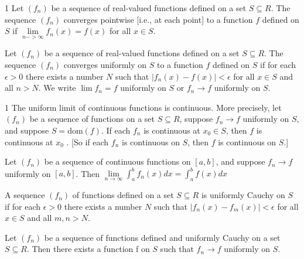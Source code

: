 

\begin{defn}{1}
	Let $(f_n)$ be a sequence of real-valued functions defined on a set $S \subseteq R$. The sequence $(f_n)$ converges pointwise [i.e., at each point] to a	function $f$ defined on $S$ if $\lim\limits_{n->\infty} f_n(x) = f(x)$	for all $x \in S$.
\end{defn}

\begin{defn}{1}
	Let $(f_n)$ be a sequence of real-valued functions defined on a set
	$S \subseteq R$. The sequence $(f_n)$ converges uniformly on $S$ to a function $f$ defined on $S$ if for each $\epsilon > 0$ there exists a number $N$ such that $|f_n(x) − f(x)| < \epsilon$ for all $x \in S$ and all $n > N$. We write $\lim f_n = f$ uniformly on $S$ or $f_n \rightarrow f$ uniformly on $S$.
\end{defn}

\begin{theo}{1}
	The uniform limit of continuous functions is continuous. More precisely, let $(f_n)$ be a sequence of functions on a set $S \subseteq R$, suppose $f_n \rightarrow f$ uniformly on $S$, and suppose $S = \textrm{dom}(f)$. If each $f_n$ is
	continuous at $x_0 \in S$, then $f$ is continuous at $x_0$ . [So if each $f_n$ is
	continuous on $S$, then $f$ is continuous on $S$.]
\end{theo}


\begin{theo}{1}
	Let $(f_n)$ be a sequence of continuous functions on $[a, b]$, and suppose $f_n \rightarrow f$ uniformly on $[a, b]$. Then $\lim\limits_{n\rightarrow \infty} \int_{a}^{b}f_n(x) dx = \int_{a}^{b} f(x) dx$
\end{theo}

\begin{defn}{1}
	A sequence $(f_n)$ of functions defined on a set $S \subseteq R$ is uniformly Cauchy on $S$ if for each $\epsilon > 0$ there exists a number $N$ such that $|f_n(x) - f_m(x)| < \epsilon$ for all $x \in S$ and all $m, n > N$.
\end{defn}

\begin{theo}{1}
	Let $(f_n)$ be a sequence of functions defined and uniformly Cauchy on a set $S \subseteq R$. Then there exists a function f on $S$ such that $f_n \rightarrow f$ uniformly on $S$.
\end{theo}

